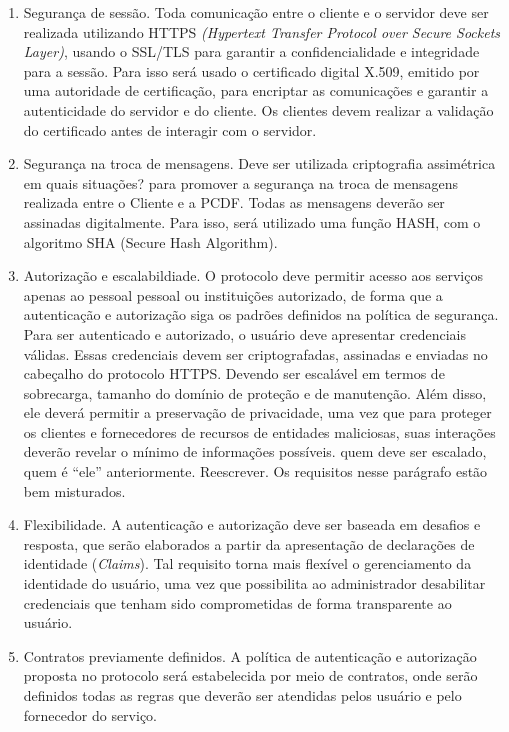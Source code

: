 \begin{enumerate}[RQ1]

\item Segurança de sessão. Toda comunicação entre o cliente e o servidor deve ser realizada utilizando HTTPS
\emph{(Hypertext Transfer Protocol over Secure Sockets Layer)}, usando o SSL/TLS para garantir a confidencialidade
e integridade para a sessão. Para isso será usado o certificado digital X.509, emitido por uma autoridade de certificação,
para encriptar as comunicações e garantir a autenticidade do servidor e do cliente. Os clientes devem realizar a validação do
certificado antes de interagir com o servidor.

\item Seguran\c ca na troca de mensagens. Deve ser utilizada criptografia assimétrica {\color{red} em quais situa\c c\~{o}es?}
para promover a segurança na troca de mensagens realizada entre o Cliente e a PCDF.
Todas as mensagens deverão ser assinadas digitalmente. Para isso, será utilizado uma função HASH, com o algoritmo SHA (Secure Hash Algorithm).

\item Autoriza\c c\~{a}o e escalabildiade. O protocolo deve permitir acesso aos serviços apenas ao pessoal {\color{red}pessoal ou institui\c c\~{o}es}
autorizado, de forma que a autenticação e autorização siga os padrões definidos na política de segurança. Para ser autenticado e autorizado, o usuário
deve apresentar credenciais válidas. Essas credenciais devem ser criptografadas, assinadas e enviadas no cabeçalho do protocolo HTTPS.
Devendo ser escalável em termos de sobrecarga, tamanho do domínio de proteção e de manutenção. Além disso, ele deverá permitir a
preservação de privacidade, uma vez que para proteger os clientes e fornecedores de recursos de entidades maliciosas, suas interações
deverão revelar o mínimo de informações possíveis. {\color{red}quem deve ser escalado, quem \'{e} ``ele'' anteriormente.
Reescrever. Os requisitos nesse par\'{a}grafo est\~{a}o bem misturados.}

\item Flexibilidade. A autenticação e autorização deve ser baseada em desafios e resposta, que serão elaborados a partir da apresentação de declarações de identidade (\emph{Claims}). Tal requisito torna mais flexível o gerenciamento da identidade do usuário, uma vez que possibilita ao administrador desabilitar credenciais que tenham sido comprometidas de forma transparente ao usuário.

\item Contratos previamente definidos. A política de autenticação e autorização
proposta no protocolo será estabelecida por meio de contratos, onde serão definidos
todas as regras que deverão ser atendidas pelos usuário e pelo fornecedor do serviço.

\end{enumerate}

